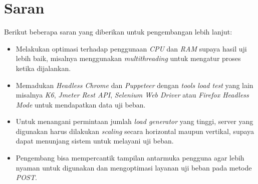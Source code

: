 	\section{Saran}
		Berikut beberapa saran yang diberikan untuk pengembangan lebih lanjut:
		\begin{itemize}
			\item Melakukan optimasi terhadap penggunaan \textit{CPU} dan \textit{RAM} supaya hasil uji lebih baik, misalnya menggunakan \textit{multithreading} untuk mengatur proses ketika dijalankan.
			\item Memadukan \textit{Headless Chrome} dan \textit{Puppeteer} dengan \textit{tools load test} yang lain misalnya \textit{K6}, \textit{Jmeter Rest API}, \textit{Selenium Web Driver} atau \textit{Firefox Headless Mode} untuk mendapatkan data uji beban.
			\item Untuk menangani permintaan jumlah \textit{load generator} yang tinggi, server yang digunakan harus dilakukan \textit{scaling} secara horizontal maupun vertikal, supaya dapat menunjang sistem untuk melayani uji beban.
			\item Pengembang bisa mempercantik tampilan antarmuka pengguna agar lebih nyaman untuk digunakan dan mengoptimasi layanan uji beban pada metode \textit{POST}.
		\end{itemize}